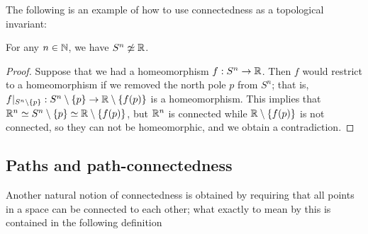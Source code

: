 The following is an example of how to use connectedness as a topological invariant:
\begin{prop}
  For any $n \in \mathbb{N}$, we have $S^n \not\simeq \mathbb{R}$.
\end{prop}
\begin{proof}
  Suppose that we had a homeomorphism $f : S^n \to \mathbb{R}$. Then $f$ would restrict to a homeomorphism if we removed the north pole $p$ from $S^n$; that is, $f|_{S^n \setminus \{p \}} : S^n \setminus \{p\} \to \mathbb{R} \setminus \{f(p)\}$ is a homeomorphism. This implies that $\mathbb{R}^n \simeq S^n \setminus \{p\} \simeq \mathbb{R} \setminus \{f(p)\}$, but $\mathbb{R}^n$ is connected while $\mathbb{R} \setminus \{f(p)\}$ is not connected, so they can not be homeomorphic, and we obtain a contradiction.
\end{proof}

\subsection{Paths and path-connectedness}
Another natural notion of connectedness is obtained by requiring that all points in a space can be connected to each other; what exactly to mean by this is contained in the following definition

